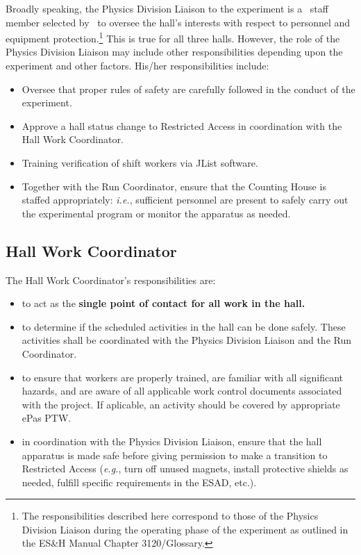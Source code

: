 \documentclass[11pt]{article}
\begin{document}
Broadly speaking, the Physics Division Liaison to the experiment 
is a \HALL\ staff member selected by  \HALLLEADER ~to oversee the hall's interests with respect to personnel and equipment 
protection.\footnote{The responsibilities described here correspond 
to those of the Physics Division Liaison during
the operating phase of the experiment as outlined in the
ES\&H Manual Chapter 3120/Glossary.} 
This is true for all three halls. However, the role of
the Physics Division Liaison may include other responsibilities
depending upon the experiment and other factors. His/her responsibilities
include:
\begin{itemize}
\item Oversee that proper rules of safety are carefully followed in the 
conduct of the experiment.
\item Approve a hall status change to Restricted Access in coordination
with the Hall Work Coordinator.
\item Training verification of shift workers via JList software.
\item Together with the Run Coordinator, 
ensure that the Counting House is staffed appropriately: {\it i.e.},
sufficient personnel are present to safely carry out the experimental 
program or monitor the apparatus as needed.
\end{itemize}  

\subsection{Hall Work Coordinator}

The Hall Work Coordinator's responsibilities are: 

\begin{itemize}

\item  to act as the {\bf single point of contact for all work in the hall.}

\item to determine if the scheduled activities in the hall can be done safely.
These activities shall be coordinated with the Physics Division Liaison
and the Run Coordinator. 


\item to ensure that workers are properly trained, are familiar with all
significant hazards, and are aware of all applicable work control
documents associated with the project. If aplicable, an activity should be covered by appropriate ePas PTW.

\item in coordination with the Physics Division Liaison, 
ensure that the hall apparatus is made safe before giving permission to
make a transition to Restricted Access ({\it e.g.}, turn off unused magnets,
install protective shields as needed, fulfill specific requirements in the
ESAD, etc.).

 
\end{itemize}
\end{document}
